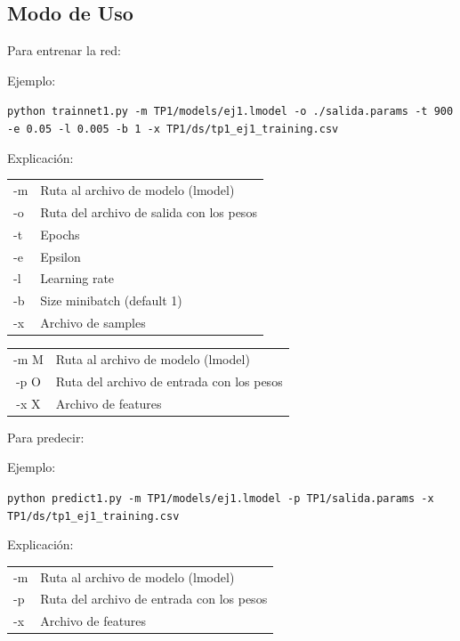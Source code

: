\newpage

\subsection{Modo de Uso}

Para entrenar la red:

Ejemplo: 

\noindent\texttt{python trainnet1.py -m TP1/models/ej1.lmodel -o ./salida.params -t 900 -e 0.05 -l 0.005 -b 1 -x TP1/ds/tp1\_ej1\_training.csv}

Explicación:

\begin{tabular}{ l l }
-m & Ruta al archivo de modelo (lmodel) \\
-o & Ruta del archivo de salida con los pesos\\
-t & Epochs\\
-e & Epsilon\\
-l & Learning rate\\
-b & Size minibatch (default 1)\\
-x & Archivo de samples\\
\end{tabular}

\begin{tabular}{ c l }
-m M & Ruta al archivo de modelo (lmodel)\\
-p  O & Ruta del archivo de entrada con los pesos\\
-x  X & Archivo de features\\
\end{tabular}

Para predecir:

Ejemplo:

\noindent\texttt{\small{python predict1.py -m TP1/models/ej1.lmodel -p TP1/salida.params -x TP1/ds/tp1\_ej1\_training.csv}}

Explicación:

\begin{tabular}{ l l }
-m & Ruta al archivo de modelo (lmodel)\\
-p & Ruta del archivo de entrada con los pesos\\
-x & Archivo de features\\
\end{tabular}
